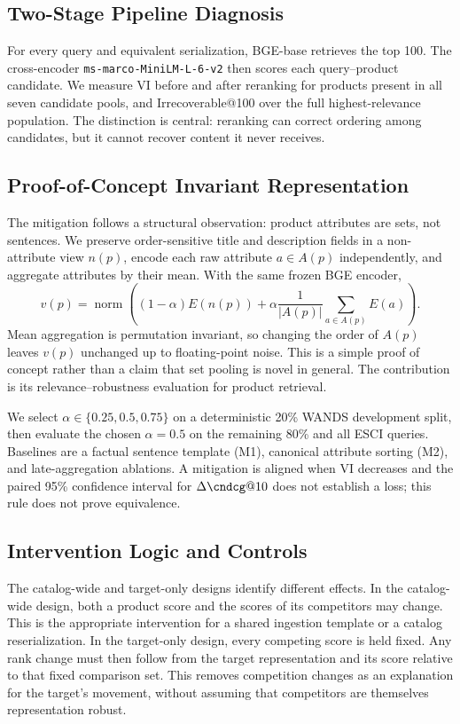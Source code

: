 \subsection{Two-Stage Pipeline Diagnosis}

For every query and equivalent serialization, BGE-base retrieves the top 100. The cross-encoder \texttt{ms-marco-MiniLM-L-6-v2} then scores each query--product candidate. We measure VI before and after reranking for products present in all seven candidate pools, and Irrecoverable@100 over the full highest-relevance population. The distinction is central: reranking can correct ordering among candidates, but it cannot recover content it never receives.

\subsection{Proof-of-Concept Invariant Representation}

The mitigation follows a structural observation: product attributes are sets, not sentences. We preserve order-sensitive title and description fields in a non-attribute view $n(p)$, encode each raw attribute $a\in A(p)$ independently, and aggregate attributes by their mean. With the same frozen BGE encoder,
\begin{equation}
v(p)=\operatorname{norm}\left((1-\alpha)E(n(p))+
\alpha\frac{1}{|A(p)|}\sum_{a\in A(p)}E(a)\right).
\end{equation}
Mean aggregation is permutation invariant, so changing the order of $A(p)$ leaves $v(p)$ unchanged up to floating-point noise. This is a simple proof of concept rather than a claim that set pooling is novel in general. The contribution is its relevance--robustness evaluation for product retrieval.

We select $\alpha\in\{0.25,0.5,0.75\}$ on a deterministic 20\% WANDS development split, then evaluate the chosen $\alpha=0.5$ on the remaining 80\% and all ESCI queries. Baselines are a factual sentence template (M1), canonical attribute sorting (M2), and late-aggregation ablations. A mitigation is aligned when VI decreases and the paired 95\% confidence interval for $\Delta\cndcg@10$ does not establish a loss; this rule does not prove equivalence.

\subsection{Intervention Logic and Controls}

The catalog-wide and target-only designs identify different effects. In the catalog-wide design, both a product score and the scores of its competitors may change. This is the appropriate intervention for a shared ingestion template or a catalog reserialization. In the target-only design, every competing score is held fixed. Any rank change must then follow from the target representation and its score relative to that fixed comparison set. This removes competition changes as an explanation for the target's movement, without assuming that competitors are themselves representation robust.

